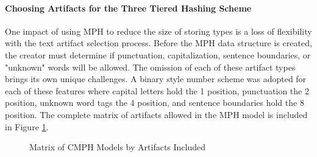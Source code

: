 		\paragraph{Choosing Artifacts for the Three Tiered Hashing Scheme} One impact of using MPH to reduce the size of storing types is a loss of flexibility with the text artifact selection process.  Before the MPH data structure is created, the creator must determine if punctuation, capitalization, sentence boundaries, or "unknown" words will be allowed.  The omission of each of these artifact types brings its own unique challenges. A binary style number scheme was adopted for each of these features where capital letters hold the 1 position, punctuation the 2 position, unknown word tags the 4 position, and sentence boundaries hold the 8 position.  The complete matrix of artifacts allowed in the MPH model is included in Figure \ref{fig:cmphMatrix}.
		
		\begin{figure}[ht!]
			\begin{center}
				\caption{Matrix of CMPH Models by Artifacts Included}
				\label{fig:cmphMatrix}
			\end{center}
		\end{figure}
		

